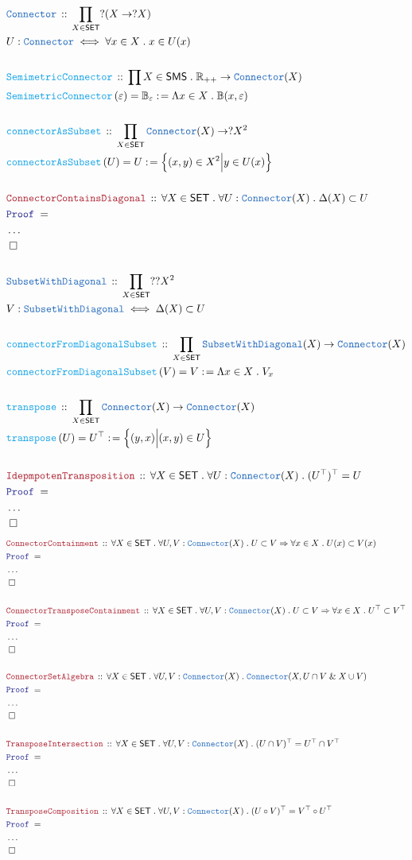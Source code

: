 \documentclass[12pt]{scrartcl}
\newcommand{\TYPE}[1]{\textcolor{NavyBlue}{\mathtt{#1}}}
\newcommand{\FUNC}[1]{\textcolor{Cerulean}{\mathtt{#1}}}
\newcommand{\LOGIC}[1]{\textcolor{Blue}{\mathtt{#1}}}
\newcommand{\THM}[1]{\textcolor{Maroon}{\mathtt{#1}}}
\renewcommand{\.}{\; . \;}
\newcommand{\de}{: \kern 0.1pc =}
\newcommand{\Act}[1]{\left( #1 \right)}
\newcommand{\Theorem}[2]{& \THM{#1} \, :: \, #2 \\ & \Proof = \\ }
\newcommand{\DeclareType}[2]{& \TYPE{#1} \, :: \, #2 \\}
\newcommand{\DefineType}[3]{& #1 : \TYPE{#2} \iff #3 \\}
\newcommand{\DeclareFunc}[2]{& \FUNC{#1} \, :: \, #2 \\}
\newcommand{\DefineNamedFunc}[4]{&  \FUNC{#1}\Act{#2} = #3 \de #4 \\}
\newcommand{\Page}[1]{ \begin{align*} #1 \end{align*}   }
\newcommand{\NoProof}{ & \ldots \\ \EndProof}
\renewcommand{\And}{\; \& \;}
\newcommand{\Imply}{\Rightarrow}
\newcommand{\Reals}{\mathbb{R} }
\newcommand{\QED}{\; \square}
\newcommand{\EndProof}{& \QED \\}
\newcommand{\Proof}{\LOGIC{Proof} \; }
\newcommand{\SET}{\mathsf{SET}}
\newcommand{\SMS}{\mathsf{SMS}}
\newcommand{\Connector}{\TYPE{Connector}}
\begin{document}
\Page{
	\DeclareType{Connector}
	{
		\prod_{X \in \SET} ?(X \to ?X)
	}
	\DefineType{U}{Connector}{\forall x \in X \. x \in U(x)}
	\\
	\DeclareFunc{SemimetricConnector}
	{
		\prod X \in \SMS \. 
		\Reals_{++} \to \TYPE{Connector}(X)
	}
	\DefineNamedFunc{SemimetricConnector}{\varepsilon}
	{\mathbb{B}_\varepsilon}
	{
		\Lambda x \in X \. \mathbb{B}(x,\varepsilon)
	}
	\\
	\DeclareFunc{connectorAsSubset}
	{
		\prod_{X \in \SET} \TYPE{Connector}(X) \to ?X^2 
	}
	\DefineNamedFunc{connectorAsSubset}{U}{U}
	{
		\Big\{ (x,y) \in X^2 \Big|  y \in U(x) \Big\}
	}
	\\
	\Theorem{ConnectorContainsDiagonal}
	{
		\forall X \in \SET \.
		\forall U : \TYPE{Connector}(X) \.
		\Delta(X) \subset U
	}
	\NoProof
	\\
	\DeclareType{SubsetWithDiagonal}
	{
		\prod_{X \in \SET} ??X^2
	}
	\DefineType{V}{SubsetWithDiagonal}{\Delta(X) \subset U}
	\\
	\DeclareFunc{connectorFromDiagonalSubset}
	{
		\prod_{X \in \SET}
		\TYPE{SubsetWithDiagonal}(X) \to \Connector(X)
	}
	\DefineNamedFunc{connectorFromDiagonalSubset}{V}{V}
	{
		\Lambda x \in X \. V_x	
	}
	\\
	\DeclareFunc{transpose}
	{
		\prod_{X \in \SET}  \Connector(X) \to \Connector(X)
	}
	\DefineNamedFunc{transpose}{U}{U^\top}{\Big\{ (y,x)  \Big| (x,y)  \in U   \Big\}}
	\\
	\Theorem{IdepmpotenTransposition}
	{
		\forall X \in \SET \.
		\forall U : \Connector(X) \.
		(U^\top)^\top = U
	}
	\NoProof
}\Page{
	\Theorem{ConnectorContainment}
	{
		\forall X \in \SET \.
		\forall U,V : \Connector(X) \.
		U \subset V \Imply \forall x \in X \. U(x) \subset V(x)
	}
	\NoProof
	\\
	\Theorem{ConnectorTransposeContainment}
	{
		\forall X \in \SET \.
		\forall U,V : \Connector(X) \.
		U \subset V \Imply \forall x \in X \. U^\top \subset V^\top
	}
	\NoProof
	\\
	\Theorem{ConnectorSetAlgebra}
	{
		\forall X \in \SET \.
		\forall U,V : \Connector(X) \.
		\Connector(X,U \cap V \And X \cup V)
	}
	\NoProof
	\\
	\Theorem{TransposeIntersection}
	{
		\forall X \in \SET \.
		\forall U,V : \Connector(X) \.
		(U\cap V)^\top = U^\top \cap V^\top
	}
	\NoProof
	\\
	\Theorem{TransposeComposition}
	{
		\forall X \in \SET \.
		\forall U,V : \Connector(X) \.
		(U \circ V)^\top = V^\top \circ U^\top
	}
	\NoProof
	\\
}
\end{document}
